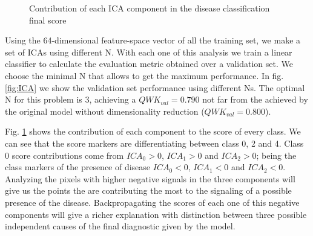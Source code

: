 \documentclass{llncs}
\begin{document}
\begin{figure}
	\centering	
	\caption{Contribution of each ICA component in the disease classification final score}
	\label{fig:ica_contribution}
\end{figure}

Using the 64-dimensional feature-space vector of all the training set, we make a set of ICAs using different N. With each one of this analysis we train a linear classifier to calculate the evaluation metric obtained over a validation set. We choose the minimal N that allows to get the maximum performance. In fig. \ref{fig:ICA} we show the validation set performance using different Ns. The optimal N for this problem is $3$, achieving a $QWK_{val} = 0.790$ not far from the achieved by the original model without dimensionality reduction ($QWK_{val} = 0.800$).

Fig. \ref{fig:ica_contribution} shows the contribution of each component to the score of every class. We can see that the score markers are differentiating between class 0, 2 and 4.  Class 0 score contributions come from $ICA_0 > 0$, $ICA_1 > 0$ and $ICA_2 > 0$; being the class markers of the presence of disease $ICA_0 < 0$, $ICA_1 < 0$ and $ICA_2 < 0$. Analyzing the pixels with higher negative signals in the three components will give us the points the are contributing the most to the signaling of a possible presence of the disease. Backpropagating the scores of each one of this negative components will give a richer explanation with distinction between three possible independent causes of the final diagnostic given by the model.
\end{document}
